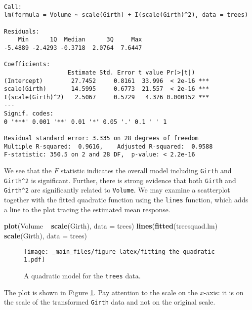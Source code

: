\documentclass[]{book}
\newenvironment{Shaded}{\begin{snugshade}}{\end{snugshade}}
\newcommand{\KeywordTok}[1]{\textcolor[rgb]{0.13,0.29,0.53}{\textbf{{#1}}}}
\newcommand{\DataTypeTok}[1]{\textcolor[rgb]{0.13,0.29,0.53}{{#1}}}
\newcommand{\StringTok}[1]{\textcolor[rgb]{0.31,0.60,0.02}{{#1}}}
\newcommand{\NormalTok}[1]{{#1}}
\numberwithin{equation}{chapter}
\numberwithin{figure}{chapter}
\theoremstyle{plain}
\theoremstyle{definition}
\theoremstyle{remark}
\theoremstyle{definition}
\theoremstyle{definition}
\theoremstyle{remark}
\begin{document}
\begin{verbatim}

Call:
lm(formula = Volume ~ scale(Girth) + I(scale(Girth)^2), data = trees)

Residuals:
    Min      1Q  Median      3Q     Max 
-5.4889 -2.4293 -0.3718  2.0764  7.6447 

Coefficients:
                  Estimate Std. Error t value Pr(>|t|)    
(Intercept)        27.7452     0.8161  33.996  < 2e-16 ***
scale(Girth)       14.5995     0.6773  21.557  < 2e-16 ***
I(scale(Girth)^2)   2.5067     0.5729   4.376 0.000152 ***
---
Signif. codes:  
0 '***' 0.001 '**' 0.01 '*' 0.05 '.' 0.1 ' ' 1

Residual standard error: 3.335 on 28 degrees of freedom
Multiple R-squared:  0.9616,    Adjusted R-squared:  0.9588 
F-statistic: 350.5 on 2 and 28 DF,  p-value: < 2.2e-16
\end{verbatim}

We see that the \(F\) statistic indicates the overall model including
\texttt{Girth} and \texttt{Girth\^{}2} is significant. Further, there is
strong evidence that both \texttt{Girth} and \texttt{Girth\^{}2} are
significantly related to \texttt{Volume}. We may examine a scatterplot
together with the fitted quadratic function using the \texttt{lines}
function, which adds a line to the plot tracing the estimated mean
response.

\begin{Shaded}
\begin{Highlighting}[]
\KeywordTok{plot}\NormalTok{(Volume ~}\StringTok{ }\KeywordTok{scale}\NormalTok{(Girth), }\DataTypeTok{data =} \NormalTok{trees)}
\KeywordTok{lines}\NormalTok{(}\KeywordTok{fitted}\NormalTok{(treesquad.lm) ~}\StringTok{ }\KeywordTok{scale}\NormalTok{(Girth), }\DataTypeTok{data =} \NormalTok{trees)}
\end{Highlighting}
\end{Shaded}

\begin{figure}[htbp]
\centering
\texttt{[image: \_main\_files/figure-latex/fitting-the-quadratic-1.pdf]}
\caption{\label{fig:fitting-the-quadratic}\small A quadratic model for the
\texttt{trees} data.}
\end{figure}




The plot is shown in Figure \ref{fig:fitting-the-quadratic}. Pay
attention to the scale on the \(x\)-axis: it is on the scale of the
transformed \texttt{Girth} data and not on the original scale.
\end{document}
